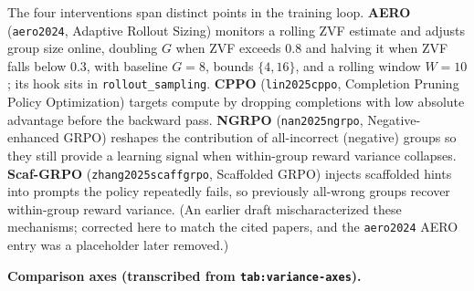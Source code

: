 \documentclass[
  american,
  11pt,
  a4paper,
  oneside]{report}
\begin{document}
The four interventions span distinct points in the training loop.
\textbf{AERO} (\texttt{aero2024}, Adaptive Rollout Sizing) monitors a
rolling ZVF estimate and adjusts group size online, doubling \(G\) when
ZVF exceeds 0.8 and halving it when ZVF falls below 0.3, with baseline
\(G{=}8\), bounds \(\{4,16\}\), and a rolling window \(W{=}10\); its
hook sits in \texttt{rollout\_sampling}. \textbf{CPPO}
(\texttt{lin2025cppo}, Completion Pruning Policy Optimization) targets
compute by dropping completions with low absolute advantage before the
backward pass.
\textbf{NGRPO} (\texttt{nan2025ngrpo}, Negative-enhanced GRPO) reshapes
the contribution of all-incorrect (negative) groups so they still provide
a learning signal when within-group reward variance collapses.
\textbf{Scaf-GRPO} (\texttt{zhang2025scaffgrpo}, Scaffolded GRPO) injects
scaffolded hints into prompts the policy repeatedly fails, so previously
all-wrong groups recover within-group reward variance. (An earlier draft
mischaracterized these mechanisms; corrected here to match the cited
papers, and the \texttt{aero2024} AERO entry was a placeholder later
removed.)

\textbf{Comparison axes (transcribed from \texttt{tab:variance-axes}).}
\end{document}
